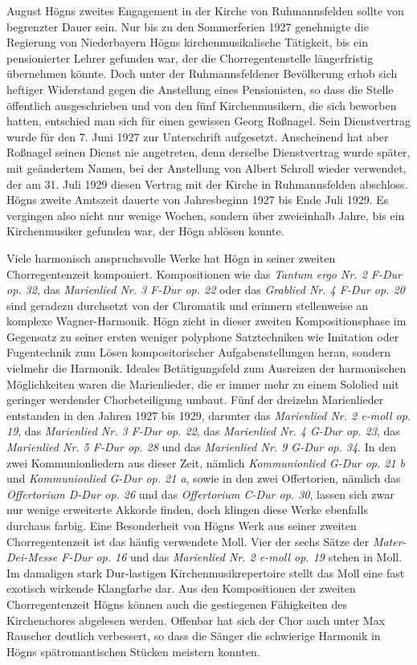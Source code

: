 \documentclass{book}
\begin{document}
August Högns zweites Engagement in der Kirche von Ruhmannsfelden sollte
von begrenzter Dauer sein. Nur bis zu den Sommerferien 1927
genehmigte die Regierung von Niederbayern Högns kirchenmusikalische
Tätigkeit, bis ein pensionierter Lehrer gefunden war, der die
Chorregentenstelle längerfristig übernehmen könnte. Doch unter der
Ruhmannsfeldener Bevölkerung erhob sich heftiger Widerstand gegen die
Anstellung eines Pensionisten, so dass die Stelle öffentlich
ausgeschrieben und von den fünf Kirchenmusikern, die sich beworben
hatten, entschied man sich für einen gewissen Georg Roßnagel. Sein
Dienstvertrag wurde für den 7. Juni 1927 zur Unterschrift aufgesetzt.
Anscheinend hat aber Roßnagel seinen Dienst nie angetreten, denn
derselbe Dienstvertrag wurde später, mit geändertem Namen, bei der
Anstellung von Albert Schroll wieder verwendet, der am 31. Juli 1929
diesen Vertrag mit der Kirche in Ruhmannsfelden abschloss. Högns zweite
Amtszeit dauerte von Jahresbeginn 1927 bis Ende Juli 1929. Es vergingen
also nicht nur wenige Wochen, sondern über zweieinhalb Jahre, bis ein
Kirchenmusiker gefunden war, der Högn ablösen konnte.

Viele harmonisch anspruchsvolle Werke hat Högn in seiner zweiten
Chorregentenzeit komponiert. Kompositionen wie das \textit{Tantum
ergo Nr. 2 F-Dur} \textit{op. 32}, das \textit{Marienlied Nr. 3 F-Dur
op. 22} oder das \textit{Grablied Nr. 4 F-Dur op. 20} sind geradezu
durchsetzt von der Chromatik und erinnern stellenweise an komplexe
Wagner-Harmonik. Högn zieht in dieser zweiten Kompositionsphase im
Gegensatz zu seiner ersten weniger polyphone Satztechniken wie
Imitation oder Fugentechnik zum Lösen kompositorischer
Aufgabenstellungen heran, sondern vielmehr die Harmonik. Ideales
Betätigungsfeld zum Ausreizen der harmonischen Möglichkeiten waren die
Marienlieder, die er immer mehr zu einem Sololied mit geringer
werdender Chorbeteiligung umbaut. Fünf der dreizehn Marienlieder
entstanden in den Jahren 1927 bis 1929, darunter das \textit{Marienlied
Nr. 2 e-moll op. 19}, das \textit{Marienlied Nr. 3 F-Dur op. 22}, das
\textit{Marienlied Nr. 4 G-Dur op. 23}, das \textit{Marienlied Nr. 5
F-Dur op. 28} und das \textit{Marienlied Nr. 9 G-Dur op. 34}. In den
zwei Kommunionliedern aus dieser Zeit, nämlich
\textit{Kommu}\textit{nionlied G-Dur op. 21 b} und
\textit{Kommunionlied G-Dur op. 21 a}, sowie in den zwei Offertorien,
nämlich das \textit{Offertorium D-Dur op. 26} und das
\textit{Offertorium C-Dur op. 30}, lassen sich zwar nur wenige
erweiterte Akkorde finden, doch klingen diese Werke ebenfalls durchaus
farbig. Eine Besonderheit von Högns Werk aus seiner zweiten
Chorregentenzeit ist das häufig verwendete Moll. Vier der sechs Sätze
der \textit{Mater-Dei-Messe F-Dur op. 16} und das \textit{Marienlied
Nr. 2 e-moll op. 19} stehen in Moll. Im damaligen stark Dur-lastigen
Kirchenmusikrepertoire stellt das Moll eine fast exotisch wirkende
Klangfarbe dar. Aus den Kompositionen der zweiten Chorregentenzeit
Högns können auch die gestiegenen Fähigkeiten des Kirchenchores
abgelesen werden. Offenbar hat sich der Chor auch unter Max Rauscher
deutlich verbessert, so dass die Sänger die schwierige Harmonik in
Högns spätromantischen Stücken meistern konnten.
\end{document}
